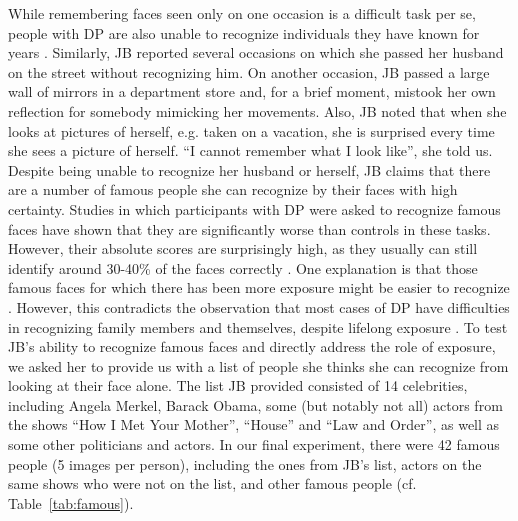 \documentclass[fleqn,10pt]{SelfArx} %
\begin{document}
While remembering faces seen only on one occasion is a difficult task per se, people with DP are also unable to recognize individuals they have known for years \citep{Ariel_1996, Nunn_2001, Jones_2001, Fine_2011}. Similarly, JB reported several occasions on which she passed her husband on the street without recognizing him. On another occasion, JB passed a large wall of mirrors in a department store and, for a brief moment, mistook her own reflection for somebody mimicking her movements. Also, JB noted that when she looks at pictures of herself, e.g. taken on a vacation, she is surprised every time she sees a picture of herself. “I cannot remember what I look like”, she told us.
Despite being unable to recognize her husband or herself, JB claims that there are a number of famous people she can recognize by their faces with high certainty. Studies in which participants with DP were asked to recognize famous faces have shown that they are significantly worse than controls in these tasks. However, their absolute scores are surprisingly high, as they usually can still identify around 30-40\% of the faces correctly \citep{Rivolta_2012, Garrido_2009}. One explanation is that those famous faces for which there has been more exposure might be easier to recognize \citep{Rivolta_2012}. However, this contradicts the observation that most cases of DP have difficulties in recognizing family members and themselves, despite lifelong exposure \citep{Sacks, Nunn_2001, Fine_2011, Duchaine_2011}.
To test JB's ability to recognize famous faces and directly address the role of exposure, we asked her to provide us with a list of people she thinks she can recognize from looking at their face alone. The list JB provided consisted of 14 celebrities, including Angela Merkel, Barack Obama, some (but notably not all) actors from the shows “How I Met Your Mother”, “House” and “Law and Order”, as well as some other politicians and actors. In our final experiment, there were 42 famous people (5 images per person), including the ones from JB's list, actors on the same shows who were not on the list, and other famous people (cf. Table~\ref{tab:famous}). 
\end{document}
